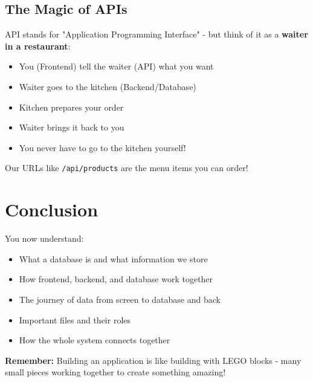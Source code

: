 \documentclass[12pt]{article}
\begin{document}
\subsection{The Magic of APIs}

API stands for "Application Programming Interface" - but think of it as a \textbf{waiter in a restaurant}:
\begin{itemize}
    \item You (Frontend) tell the waiter (API) what you want
    \item Waiter goes to the kitchen (Backend/Database)
    \item Kitchen prepares your order
    \item Waiter brings it back to you
    \item You never have to go to the kitchen yourself!
\end{itemize}

Our URLs like \texttt{/api/products} are the menu items you can order!

\section{Conclusion}

You now understand:
\begin{itemize}
    \item What a database is and what information we store
    \item How frontend, backend, and database work together
    \item The journey of data from screen to database and back
    \item Important files and their roles
    \item How the whole system connects together
\end{itemize}

\textbf{Remember:} Building an application is like building with LEGO blocks - many small pieces working together to create something amazing!
\end{document}
